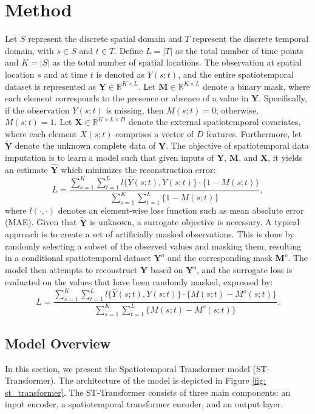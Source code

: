 \documentclass[11pt]{article}
\begin{document}
\section{Method}\label{sec: method}
Let $S$ represent the discrete spatial domain and $T$ represent the discrete temporal domain, with $s \in S$ and $t \in T$. Define $L=|T|$ as the total number of time points and $K=|S|$ as the total number of spatial locations. The observation at spatial location $s$ and at time $t$ is denoted as $Y(s;t)$, and the entire spatiotemporal dataset is represented as $\boldsymbol{Y} \in \mathbb{R}^{K\times L}$.
 Let $\boldsymbol{M} \in \mathbb{R}^{K \times L}$ denote a binary mask, where each element corresponds to the presence or absence of a value in $\boldsymbol{Y}$. Specifically, if the observation $Y(s;t)$ is missing, then $M(s;t) = 0$; otherwise, $M(s;t) = 1$. Let $\boldsymbol{X} \in \mathbb{R}^{K \times L \times D}$ denote the external spatiotemporal covariates, where each element $X(s;t)$ comprises a vector of $D$ features. Furthermore, let $\tilde{\boldsymbol{Y}}$ denote the unknown complete data of $\boldsymbol{Y}$. The objective of spatiotemporal data imputation is to learn a model such that given inputs of $\boldsymbol{Y}$, $\boldsymbol{M}$, and $\boldsymbol{X}$, it yields an estimate $\hat{\boldsymbol{Y}}$ which minimizes the reconstruction error:
\begin{equation}
	L = \frac{\sum_{s=1}^K \sum_{t=1}^L l\{\hat{Y}(s;t), \tilde{Y}(s;t)\} \cdot \{1-M(s;t)\}}{\sum_{s=1}^{K}\sum_{t=1}^{L}\{1-M(s;t)\}},
\end{equation}
where $l(\cdot, \cdot)$ denotes an element-wise loss function such as mean absolute error (MAE). Given that $\tilde{\boldsymbol{Y}}$ is unknown, a surrogate objective is necessary. A typical approach is to create a set of artificially masked observations. This is done by randomly selecting a subset of the observed values and masking them, resulting in a conditional spatiotemporal dataset $\boldsymbol{Y}^{o}$ and the corresponding mask $\boldsymbol{M}^{o}$. The model then attempts to reconstruct $\boldsymbol{Y}$ based on $\boldsymbol{Y}^{o}$, and the surrogate loss is evaluated on the values that have been randomly masked, expressed by:
\begin{equation}
	L = \frac{\sum_{s=1}^K \sum_{t=1}^L l\{\hat{Y}(s;t), Y(s;t)\} \cdot \{M(s;t)-M^{o}(s;t)\}}{\sum_{s=1}^{K}\sum_{t=1}^{L}\{M(s;t)-M^{o}(s;t)\}}.
	\label{eq: loss function}
\end{equation}


\subsection{Model Overview}
In this section, we present the Spatiotemporal Transformer model (ST-Transformer). The architecture of the model is depicted in Figure \ref{fig: st_transformer}. The ST-Transformer consists of three main components: an input encoder, a spatiotemporal transformer encoder, and an output layer. 
\end{document}
